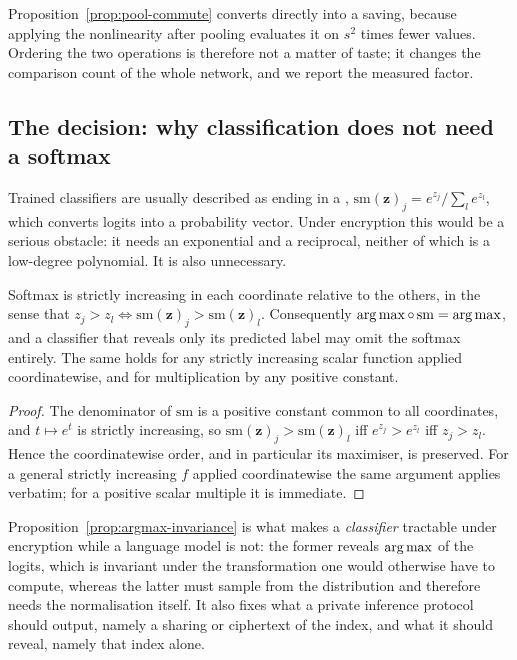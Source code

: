 Proposition~\ref{prop:pool-commute} converts directly into a saving, because
applying the nonlinearity after pooling evaluates it on $s^2$ times fewer values.
Ordering the two operations is therefore not a matter of taste; it changes the
comparison count of the whole network, and we report the measured factor.

\subsection{The decision: why classification does not need a softmax}
\label{sec:ml:argmax}

Trained classifiers are usually described as ending in a ,
$\mathrm{sm}(\mathbf{z})_j = e^{z_j}/\sum_l e^{z_l}$, which converts logits into a
probability vector. Under encryption this would be a serious obstacle: it needs an
exponential and a reciprocal, neither of which is a low-degree polynomial. It is
also unnecessary.

\begin{proposition}
\label{prop:argmax-invariance}
Softmax is strictly increasing in each coordinate relative to the others, in the
sense that $z_j > z_l \iff \mathrm{sm}(\mathbf{z})_j > \mathrm{sm}(\mathbf{z})_l$.
Consequently $\operatorname*{arg\,max} \circ\, \mathrm{sm} = \operatorname*{arg\,max}$, and a classifier that
reveals only its predicted label may omit the softmax entirely. The same holds for
any strictly increasing scalar function applied coordinatewise, and for
multiplication by any positive constant.
\end{proposition}

\begin{proof}
The denominator of $\mathrm{sm}$ is a positive constant common to all coordinates,
and $t \mapsto e^{t}$ is strictly increasing, so
$\mathrm{sm}(\mathbf{z})_j > \mathrm{sm}(\mathbf{z})_l$ iff $e^{z_j} > e^{z_l}$ iff
$z_j > z_l$. Hence the coordinatewise order, and in particular its maximiser, is
preserved. For a general strictly increasing $f$ applied coordinatewise the same
argument applies verbatim; for a positive scalar multiple it is immediate.
\end{proof}

Proposition~\ref{prop:argmax-invariance} is what makes a \emph{classifier}
tractable under encryption while a language model is not: the former reveals
$\operatorname*{arg\,max}$ of the logits, which is invariant under the transformation one would
otherwise have to compute, whereas the latter must sample from the distribution
and therefore needs the normalisation itself. It also fixes what a private
inference protocol should output, namely a sharing or ciphertext of the index, and
what it should reveal, namely that index alone.

